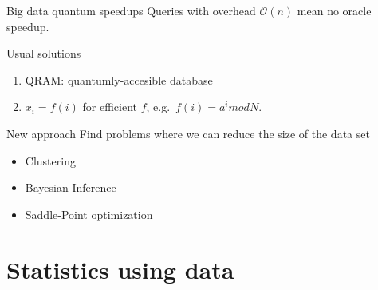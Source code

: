 \documentclass[
  ignorenonframetext,
]{beamer}
\providecommand{\tightlist}{%
  \setlength{\itemsep}{0pt}\setlength{\parskip}{0pt}}
\begin{document}
\begin{frame}{Big data quantum speedups}
\protect\hypertarget{big-data-quantum-speedups}{}
Queries with overhead \(\mathcal{O}(n)\) mean no oracle speedup.

\pause

\begin{block}{Usual solutions}
\protect\hypertarget{usual-solutions}{}
\begin{enumerate}
\tightlist
\item
  QRAM: quantumly-accesible database
\item
  \(x_i = f(i)\) for efficient \(f\), e.g.~\(f(i) = a^i mod N\).
\end{enumerate}

\pause
\end{block}

\begin{block}{New approach}
\protect\hypertarget{new-approach}{}
Find problems where we can reduce the size of the data set

\begin{itemize}
\tightlist
\item
  Clustering
\item
  Bayesian Inference
\item
  Saddle-Point optimization
\end{itemize}
\end{block}
\end{frame}

\hypertarget{statistics-using-data}{%
\section{Statistics using data}\label{statistics-using-data}}
\end{document}
